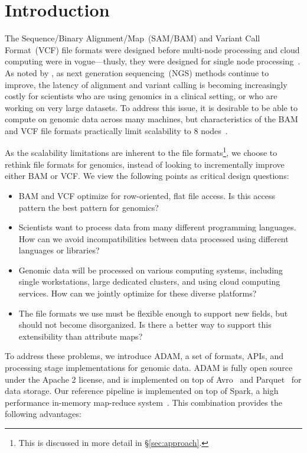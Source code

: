\documentclass{bioinfo}
\begin{document}
\section{Introduction}
\label{sec:introduction}

The Sequence/Binary Alignment/Map~(SAM/BAM) and Variant Call Format~(VCF) file formats were designed before multi-node processing
and cloud computing were in vogue---thusly, they were designed for single node processing~\citep{li09}. As noted by \citet{mcpherson09}, as
next generation sequencing~(NGS) methods continue to improve, the latency of alignment and variant calling is becoming increasingly costly
for scientists who are using genomics in a clinical setting, or who are working on very large datasets. To address this issue, it is desirable to be
able to compute on genomic data across many machines, but characteristics of the BAM and VCF file formats practically limit scalability to 8
nodes~\citep{niemenmaa12}.

As the scalability limitations are inherent to the file formats\footnote{This is discussed in more detail in \S\ref{sec:approach}.}, we
choose to rethink file formats for genomics, instead of looking to incrementally improve either BAM or VCF. We view the following
points as critical design questions:

\begin{itemize}
\item BAM and VCF optimize for row-oriented, flat file access. Is this access pattern the best pattern for genomics?
\item Scientists want to process data from many different programming languages. How can we avoid incompatibilities between
data processed using different languages or libraries?
\item Genomic data will be processed on various computing systems, including single workstations, large dedicated clusters,
and using cloud computing services. How can we jointly optimize for these diverse platforms?
\item The file formats we use must be flexible enough to support new fields, but should not become disorganized. Is there a better
way to support this extensibility than attribute maps?
\end{itemize}

To address these problems, we introduce ADAM, a set of formats, APIs, and processing stage implementations for genomic data.
ADAM is fully open source under the Apache 2 license, and is implemented on top of Avro~\citep{avro} and Parquet~\citep{parquet}
for data storage. Our reference pipeline is implemented on top of Spark, a high performance in-memory map-reduce
system~\citep{zaharia10}. This combination provides the following advantages:
\end{document}
